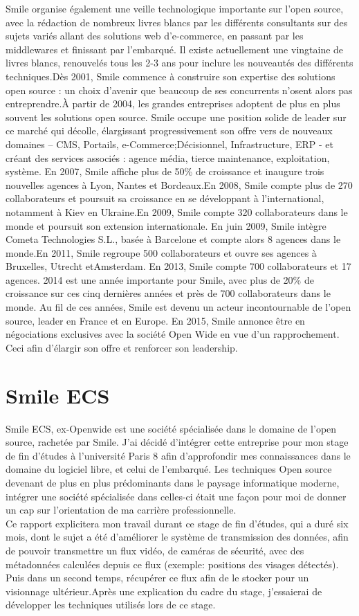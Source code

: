 Smile organise également une veille technologique importante sur l’open source, avec la rédaction de nombreux livres blancs par les différents consultants sur des sujets variés allant des solutions web d’e-commerce, en passant par les middlewares et finissant par l’embarqué. Il existe actuellement une vingtaine de livres blancs, renouvelés tous les 2-3 ans pour inclure les nouveautés des différents techniques.Dès 2001, Smile commence à construire son expertise des solutions open source : un choix d’avenir que beaucoup de ses concurrents n’osent alors pas entreprendre.À partir de 2004, les grandes entreprises adoptent de plus en plus souvent les solutions open source. Smile occupe une position solide de leader sur ce marché qui décolle, élargissant progressivement son offre vers de nouveaux domaines – CMS, Portails, e-Commerce;Décisionnel, Infrastructure, ERP - et créant des services associés : agence média, tierce maintenance, exploitation, système.  En 2007, Smile affiche plus de 50\% de croissance et inaugure trois nouvelles agences à Lyon, Nantes et Bordeaux.En 2008, Smile compte plus de 270 collaborateurs et poursuit sa croissance en se développant à l'international, notamment à Kiev en Ukraine.En 2009, Smile compte 320 collaborateurs dans le monde et poursuit son extension internationale. En juin 2009, Smile intègre Cometa Technologies S.L., basée à Barcelone et compte alors 8 agences dans le monde.En 2011, Smile regroupe 500 collaborateurs et ouvre ses agences à Bruxelles, Utrecht etAmsterdam.
En 2013, Smile compte 700 collaborateurs et 17 agences.
2014 est une année importante pour Smile, avec plus de 20\% de croissance sur ces cinq
dernières années et près de 700 collaborateurs dans le monde. Au fil de ces années, Smile est
devenu un acteur incontournable de l’open source, leader en France et en Europe.
En 2015, Smile annonce être en négociations exclusives avec la société Open Wide en vue
d’un rapprochement. Ceci afin d'élargir son offre et renforcer son leadership.


\section{Smile ECS}
Smile ECS, ex-Openwide est une société spécialisée dans le domaine de l'open source, rachetée par Smile. J'ai décidé d'intégrer cette entreprise pour mon stage de fin d'études à l'université Paris 8 afin d'approfondir mes connaissances dans le domaine du logiciel libre, et celui de l'embarqué. Les techniques Open source devenant de plus en plus prédominants dans le paysage informatique moderne, intégrer une société spécialisée dans celles-ci était une façon pour moi de donner un cap sur l'orientation de ma carrière professionnelle.\\
Ce rapport explicitera mon travail durant ce stage de fin d'études, qui a duré six mois, dont le sujet a été d'améliorer le système de transmission des données, afin de pouvoir transmettre un flux vidéo, de caméras de sécurité, avec des métadonnées calculées depuis ce flux (exemple: positions des visages détectés). Puis dans un second temps, récupérer ce flux afin de le stocker pour un visionnage ultérieur.Après une explication du cadre du stage, j'essaierai de développer les techniques utilisés lors de ce stage.
